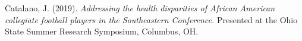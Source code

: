 

\begin{cvparagraph}

Catalano, J. (2019). \emph{Addressing the health disparities of African American collegiate football players in the Southeastern Conference.} Presented at the Ohio State Summer Research Symposium, Columbus, OH.
\end{cvparagraph}